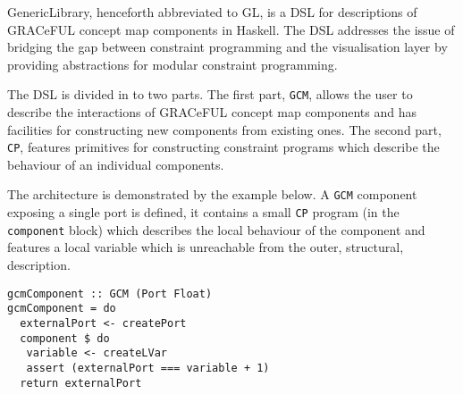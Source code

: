 GenericLibrary, henceforth abbreviated to GL, is a DSL for descriptions
of GRACeFUL concept map components in Haskell. The DSL addresses the issue
of bridging the gap between constraint programming and the visualisation
layer by providing abstractions for modular constraint programming.

The DSL is divided in to two parts. The first part, \texttt{GCM}, allows the user to describe the
interactions of GRACeFUL concept map components and has facilities for
constructing new components from existing ones. The second part,
\texttt{CP}, features primitives for constructing constraint programs
which describe the behaviour of an individual components.

The architecture is demonstrated by the example below. A \texttt{GCM}
component exposing a single port is defined, it contains a small \texttt{CP} program (in the
\texttt{component} block) which describes the local behaviour of the
component and features a local variable which is unreachable from the
outer, structural, description.

\begin{verbatim}
gcmComponent :: GCM (Port Float)
gcmComponent = do
  externalPort <- createPort
  component $ do
   variable <- createLVar
   assert (externalPort === variable + 1)
  return externalPort
\end{verbatim}
